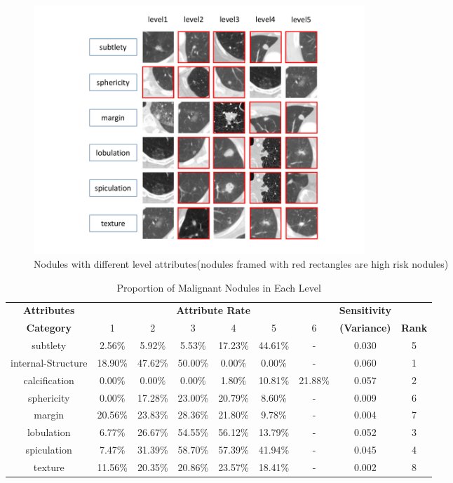 \documentclass[runningheads]{llncs}
\begin{document}
\begin{figure}[htb]
\centerline{\includegraphics[width=125mm]{nodules.pdf}}
\vspace{-0.5cm}
\caption{Nodules with different level attributes(nodules framed with red rectangles are high risk nodules)}
\vspace{-0.5cm}
\label{nodules}
\end{figure}

\begin{table}[htb]
\caption{Proportion of Malignant Nodules in Each Level}
\vspace{-0.5cm}
\begin{center}
\begin{tabular}{|c|c|c|c|c|c|c|c|c|}
\hline
\textbf{Attributes}&\multicolumn{6}{|c|}{\textbf{Attribute Rate}} & \textbf{Sensitivity}&\textbf{}\\
\cline{2-7}
\textbf{Category}& 1&2&3&4&5&6& \textbf{(Variance)}&\textbf{Rank} \\
\hline
subtlety& 2.56\% &5.92\% & 5.53\% & 17.23\% & 44.61\% & - & 0.030&5\\
internal-Structure& 18.90\% & 47.62\% & 50.00\% & 0.00\% & 0.00\% & - &0.060&1\\
calcification& 0.00\% &0.00\% & 0.00\% & 1.80\% & 10.81\% & 21.88\% & 0.057&2 \\
sphericity& 0.00\% & 17.28\% & 23.00\% & 20.79\% & 8.60\% & - &0.009&6\\
margin& 20.56\% & 23.83\% & 28.36\% & 21.80\% & 9.78\% & - &0.004&7\\
lobulation& 6.77\% & 26.67\% & 54.55\% & 56.12\% & 13.79\% & - &0.052&3\\
spiculation& 7.47\% & 31.39\% & 58.70\% & 57.39\% & 41.94\% & -&0.045& 4\\
texture& 11.56\% & 20.35\% & 20.86\% & 23.57\% & 18.41\% & - &0.002&8\\
\hline

\end{tabular}

\label{tab2}
\end{center}
\vspace{-0.5cm}
\end{table}
\end{document}

